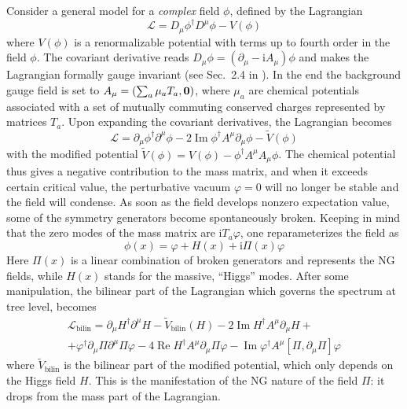 \documentclass[final,2p,times,12pt,sort&compress]{elsarticle}
\newcommand\Lag{\mathscr{L}}                %
\newcommand\vek[1]{{\boldsymbol{\bf #1}}}   %
\newcommand\he[1]{#1^{\dagger}}             %
\newcommand\imag{\mathrm i}                 %
\newcommand\de{\partial}
\newcommand\vp{\varphi}
\DeclareMathOperator{\re}{Re}               %
\DeclareMathOperator{\im}{Im}               %
\begin{document}
Consider a general model for a \emph{complex} field $\phi$, defined by the
Lagrangian \cite{Brauner:2005di}
\begin{equation}
\Lag=\he{D_\mu\phi}D^\mu\phi-V(\phi)
\end{equation}
where $V(\phi)$ is a renormalizable potential with terms up to fourth order in
the field $\phi$. The covariant derivative reads $D_\mu\phi=(\de_\mu-\imag
A_\mu)\phi$ and makes the Lagrangian formally gauge invariant
(see Sec.~2.4 in \cite{Kapusta:2006kg}). In the end the background gauge field
is set to $A_\mu=(\sum_a\mu_aT_a,\vek0)$, where $\mu_a$ are chemical potentials
associated with a set of mutually commuting conserved charges represented by
matrices $T_a$. Upon expanding the covariant derivatives, the Lagrangian becomes
\begin{equation}
\Lag=\de_\mu\he\phi\de^\mu\phi-2\im\he\phi A^\mu\de_\mu\phi-\tilde V(\phi)
\end{equation}
with the modified potential $\tilde V(\phi)=V(\phi)-\he\phi A^\mu A_\mu\phi$.
The chemical potential thus gives a negative contribution to the mass matrix,
and when it exceeds certain critical value, the perturbative vacuum $\vp=0$
will no longer be stable and the field will condense. As soon as the field
develops nonzero expectation value, some of the symmetry generators
become spontaneously broken. Keeping in mind that the zero modes of the mass
matrix are $\imag T_a\vp$, one reparameterizes the field as
\begin{equation}
\phi(x)=\vp+H(x)+\imag\Pi(x)\vp
\end{equation}
Here $\Pi(x)$ is a linear combination of broken generators and represents
the NG fields, while $H(x)$ stands for the massive, ``Higgs'' modes. After some
manipulation, the bilinear part of the Lagrangian which governs the spectrum at
tree level, becomes
\begin{multline}
\Lag_{\text{bilin}}=\de_\mu\he H\de^\mu H-\tilde V_{\text{bilin}}(H)-
2\im\he HA^\mu\de_\mu H+\\
+\he\vp\de_\mu\Pi\de^\mu\Pi\vp-4\re\he HA^\mu\de_\mu\Pi\vp
-\im\he\vp A^\mu[\Pi,\de_\mu\Pi]\vp
\label{Lbilin}
\end{multline}
where $\tilde V_{\text{bilin}}$ is the bilinear part of the modified potential,
which only depends on the Higgs field $H$. This is the manifestation of the NG
nature of the field $\Pi$: it drops from the mass part of the Lagrangian.
\end{document}
